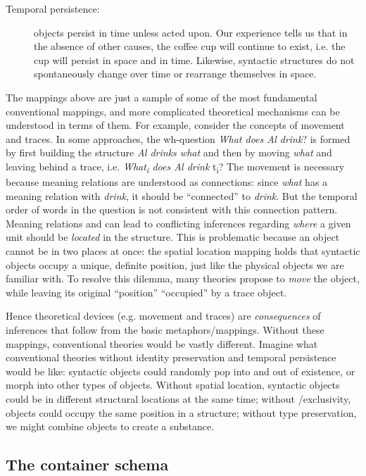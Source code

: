 \begin{description}
\item[Temporal persistence:] objects persist in time unless acted upon. Our experience tells us that in the absence of other causes, the coffee cup will continue to exist, i.e. the cup will persist in space and in time. Likewise, syntactic structures do not spontaneously change over time or rearrange themselves in space.
\end{description}

  The mappings above are just a sample of some of the most fundamental conventional mappings, and more complicated theoretical mechanisms can be understood in terms of them. For example, consider the concepts of movement and traces. In some approaches, the wh-question \textit{What does Al drink}? is formed by first building the structure \textit{Al drinks what} and then by moving \textit{what} and leaving behind a trace, i.e. \textit{What\textsubscript{i} does Al drink} t\textsubscript{i}? The movement is necessary because meaning relations are understood as connections: since \textit{what} has a meaning relation with \textit{drink}, it should be “connected” to \textit{drink}. But the temporal order of words in the question is not consistent with this connection pattern. Meaning relations and  can lead to conflicting inferences regarding \textit{where} a given unit should be \textit{located} in the structure. This is problematic because an object cannot be in two places at once: the spatial location mapping holds that syntactic objects occupy a unique, definite position, just like the physical objects we are familiar with. To resolve this dilemma, many theories propose to \textit{move} the object, while leaving its original “position” “occupied” by a trace object.

  Hence theoretical devices (e.g. movement and traces) are \textit{consequences} of inferences that follow from the basic metaphors/mappings. Without these mappings, conventional theories would be vastly different. Imagine what conventional theories without identity preservation and temporal persistence would be like: syntactic objects could randomly pop into and out of existence, or morph into other types of objects. Without spatial location, syntactic objects could be in different structural locations at the same time; without /exclusivity, objects could occupy the same position in a structure; without type preservation, we might combine objects to create a substance.

\subsection{The container schema} 

